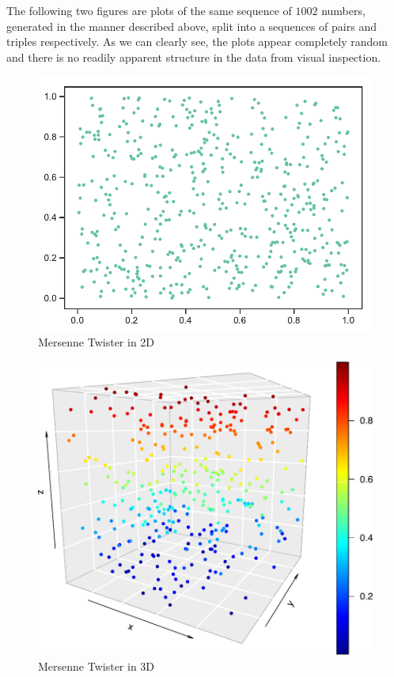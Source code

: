 \documentclass{article}
\begin{document}
\begin{enumerate}
        The following two figures are plots of the same sequence of $1002$ numbers,
        generated in the manner described above, split into a sequences of pairs and triples respectively.
        As we can clearly see, the plots appear completely random and there is no readily apparent structure in the data from visual inspection.
        \begin{figure}[H]
            \begin{minipage}{\textwidth}
                \centering
                \caption{Mersenne Twister in 2D}
                \includegraphics[scale=0.9]{../figures/mersenne2D.pdf}
            \end{minipage}
        \end{figure}
        \begin{figure}[H]
            \begin{minipage}{\textwidth}
                \centering
                \caption{Mersenne Twister in 3D}
                \includegraphics[scale=0.9]{../figures/mersenne3D.pdf}

\end{minipage}
\end{figure}
\end{enumerate}
\end{document}
